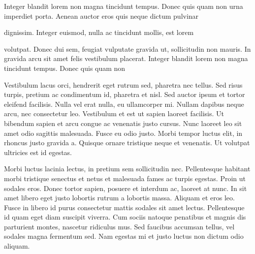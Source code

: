 \startrule\obeylines\raggedright %
Integer blandit lorem non magna tincidunt tempus. Donec quis quam non
urna imperdiet porta. Aenean auctor eros quis neque dictum pulvinar

dignissim. Integer euismod, nulla ac tincidunt mollis, est lorem

volutpat. Donec dui sem, feugiat vulputate gravida ut, sollicitudin
non mauris. In gravida arcu sit amet felis vestibulum placerat.
Integer blandit lorem non magna tincidunt tempus. Donec quis quam non
\endrule

{}

\startrule
Vestibulum lacus orci, hendrerit eget rutrum sed, pharetra nec
tellus. Sed risus turpis, pretium ac condimentum id, pharetra et
nisl. Sed auctor ipsum et tortor eleifend facilisis. Nulla vel erat
nulla, eu ullamcorper mi. Nullam dapibus neque arcu, nec consectetur
leo. Vestibulum et est ut sapien laoreet facilisis. Ut bibendum sapien
et arcu congue ac venenatis justo cursus. Nunc laoreet leo sit amet
odio sagittis malesuada. Fusce eu odio justo. Morbi tempor luctus
elit, in rhoncus justo gravida a. Quisque ornare tristique neque et
venenatis. Ut volutpat ultricies est id egestas.
\endrule

\startrule
Morbi luctus lacinia lectus, in pretium sem sollicitudin
nec. Pellentesque habitant morbi tristique senectus et netus et
malesuada fames ac turpis egestas. Proin ut sodales eros. Donec tortor
sapien, posuere et interdum ac, laoreet at nunc. In sit amet libero
eget justo lobortis rutrum a lobortis massa. Aliquam et eros
leo. Fusce in libero id purus consectetur mattis sodales sit amet
lectus. Pellentesque id quam eget diam suscipit viverra. Cum sociis
natoque penatibus et magnis dis parturient montes, nascetur ridiculus
mus. Sed faucibus accumsan tellus, vel sodales magna fermentum
sed. Nam egestas mi et justo luctus non dictum odio aliquam.

